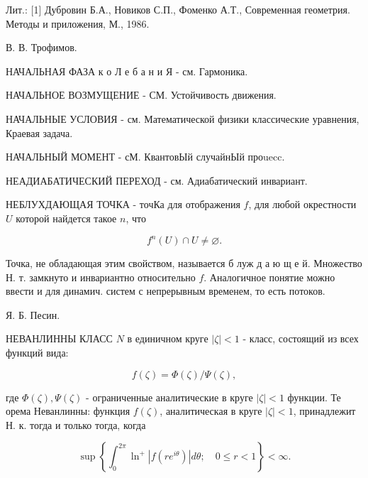 \documentclass[10pt]{article}
\begin{document}
Лит.: [1] Дубровин Б.А., Новиков С.П., Фоменко А.Т., Современная геометрия. Методы и приложения, М., 1986.



В. В. Трофимов.



НАЧАЛЬНАЯ ФАЗА к о Л е б а н и Я - см. Гармоника.



НАЧАЛЬНОЕ ВОЗМУЩЕНИЕ - СМ. Устойчивость движения.



НАЧАЛЬНЫЕ УСЛОВИЯ - см. Математической физики классические уравнения, Краевая задача.



НАЧАЛЬНЫЙ МОМЕНТ - сМ. КвантовЫй случайнЫй проuecc.



НЕАДИАБАТИЧЕСКИЙ ПЕРЕХОД - см. Адиабатический инвариант.



НЕБЛУХДАЮЩАЯ ТОЧКА - точКа для отображения $f$, для любой окрестности $U$ которой найдется такое $n$, что



\[

f^{n}(U) \cap U \neq \varnothing .

\]



Точка, не обладающая этим свойством, называется б луж д а ю щ е й. Множество Н. т. замкнуто и инвариантно относительно $f$. Аналогичное понятие можно ввести и для динамич. систем с непрерывным временем, то есть потоков.



Я. Б. Песин.



НЕВАНЛИННЫ КЛАСС $N$ в единичном круге $|\zeta|<1$ - класс, состоящий из всех функций вида:



\[

f(\zeta)=\Phi(\zeta) / \Psi(\zeta),

\]



где $\Phi(\zeta), \Psi(\zeta)$ - ограниченные аналитические в круге $|\zeta|<1$ функции. Те орема Неванлинны: функция $f(\zeta)$, аналитическая в круге $|\zeta|<1$, принадлежит Н. к. тогда и только тогда, когда



\[

\sup \left\{\int_{0}^{2 \pi} \ln ^{+}\left|f\left(r e^{i \theta}\right)\right| d \theta ; \quad 0 \leqslant r<1\right\}<\infty .

\]
\end{document}
